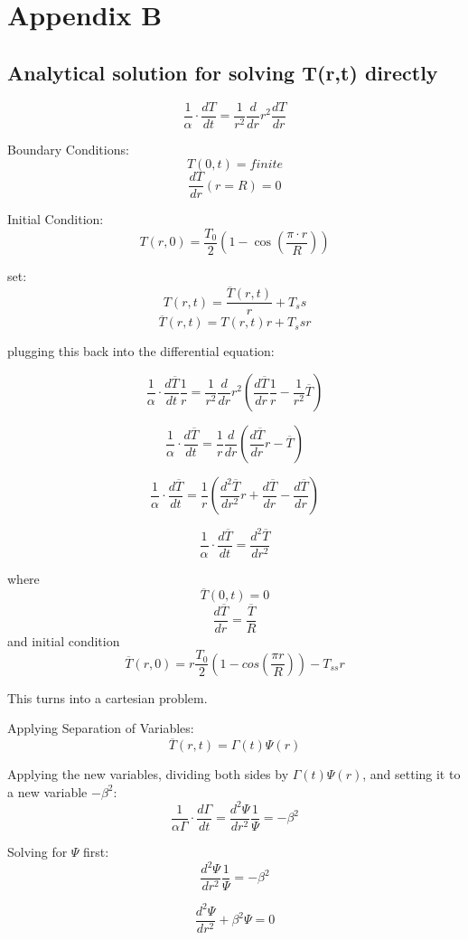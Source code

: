 \documentclass[12pt,letterpaper]{article}
\begin{document}
{\section{Appendix B}

\subsection{Analytical solution for solving T(r,t) directly}

\[\frac{1}{\alpha} \cdot \frac{dT}{dt} = \frac{1}{r^2} \frac{d}{dr} r^2 \frac{dT}{dr}\]

Boundary Conditions:
\[T(0,t) = finite \]
\[\frac{dT}{dr} (r = R) = 0 \]

Initial Condition:
\[T(r,0) = \frac{T_0}{2} (1-\cos{(\frac{\pi \cdot r}{R})}) \]

set:
\[T(r,t) = \frac{\overline{T} (r,t)}{r} +T_ss\]
\[\overline{T} (r,t) = T(r,t) r + T_ss r\]

plugging this back into the differential equation:

\[\frac{1}{\alpha} \cdot \frac{d\overline{T}}{dt} \frac{1}{r} = \frac{1}{r^2} \frac{d}{dr} r^2 (\frac{d\overline{T}}{dr} \frac{1}{r} - \frac{1}{r^2} \overline{T}) \]

\[\frac{1}{\alpha} \cdot \frac{d\overline{T}}{dt} = \frac{1}{r} \frac{d}{dr} (\frac{d\overline{T}}{dr} r - \overline{T}) \]

\[\frac{1}{\alpha} \cdot \frac{d\overline{T}}{dt} = \frac{1}{r} (\frac{d^2\overline{T}}{dr^2} r + \frac{d\overline{T}}{dr} - \frac{d\overline{T}}{dr}) \]

\[\frac{1}{\alpha} \cdot \frac{d\overline{T}}{dt} = \frac{d^2\overline{T}}{dr^2} \]

where 
\[\overline{T}(0,t) = 0 \]
\[\frac{d\overline{T}}{dr} = \frac{\overline{T}}{R}\]
and initial condition
\[\overline{T} (r,0) = r \frac{T_0}{2} (1- cos(\frac{\pi r}{R})) - T_{ss} r\]

This turns into a cartesian problem.

Applying Separation of Variables:
\[\overline{T}(r,t) = \Gamma (t) \Psi (r)  \]

Applying the new variables, dividing both sides by $\Gamma (t) \Psi (r) $,
and setting it to a new variable $ -\beta^2 $:
\[\frac{1}{\alpha  \Gamma} \cdot \frac{d\Gamma}{dt} = \frac{d^2 \Psi}{dr^2} \frac{1}{\Psi} = -\beta^2 \] 

Solving for $\Psi$ first:
\[\frac{d^2 \Psi}{dr^2} \frac{1}{\Psi} = -\beta^2 \]

\[\frac{d^2 \Psi}{dr^2} + \beta^2 \Psi = 0 \]

}
\end{document}

